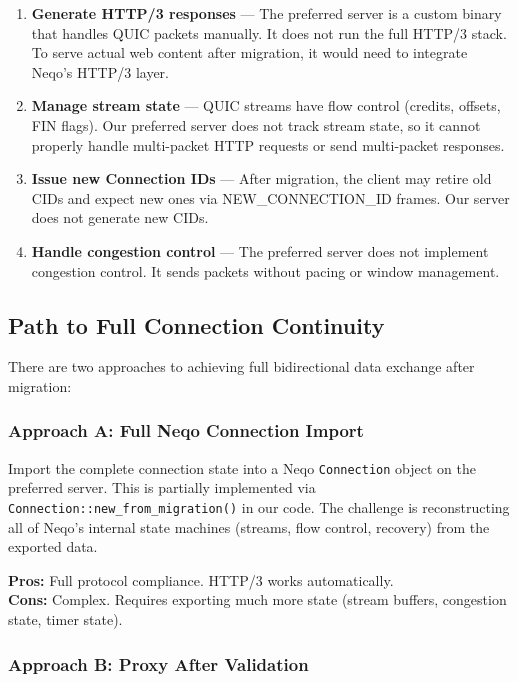 \documentclass[11pt,a4paper]{article}
\begin{document}
\begin{enumerate}
    \item \textbf{Generate HTTP/3 responses} --- The preferred server is a custom binary that handles QUIC packets manually. It does not run the full HTTP/3 stack. To serve actual web content after migration, it would need to integrate Neqo's HTTP/3 layer.

    \item \textbf{Manage stream state} --- QUIC streams have flow control (credits, offsets, FIN flags). Our preferred server does not track stream state, so it cannot properly handle multi-packet HTTP requests or send multi-packet responses.

    \item \textbf{Issue new Connection IDs} --- After migration, the client may retire old CIDs and expect new ones via NEW\_CONNECTION\_ID frames. Our server does not generate new CIDs.

    \item \textbf{Handle congestion control} --- The preferred server does not implement congestion control. It sends packets without pacing or window management.
\end{enumerate}

\subsection{Path to Full Connection Continuity}

There are two approaches to achieving full bidirectional data exchange after migration:

\subsubsection{Approach A: Full Neqo Connection Import}

Import the complete connection state into a Neqo \texttt{Connection} object on the preferred server. This is partially implemented via \texttt{Connection::new\_from\_migration()} in our code. The challenge is reconstructing all of Neqo's internal state machines (streams, flow control, recovery) from the exported data.

\textbf{Pros:} Full protocol compliance. HTTP/3 works automatically.\\
\textbf{Cons:} Complex. Requires exporting much more state (stream buffers, congestion state, timer state).

\subsubsection{Approach B: Proxy After Validation}
\end{document}
